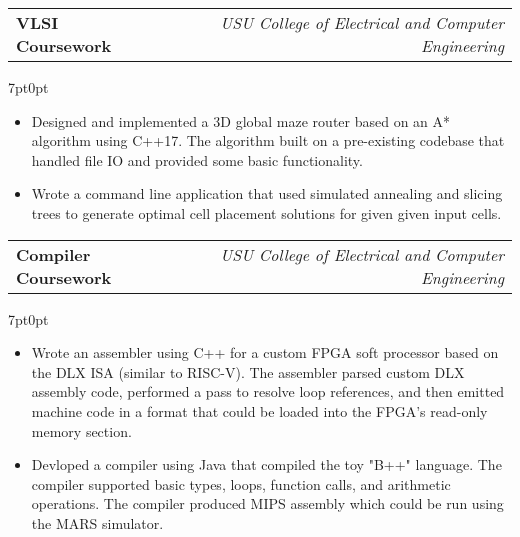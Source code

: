 \documentclass[letterpaper,12pt]{article}
\makeatletter
\newcommand{\simpleHeading}[2]{
    \vspace{-1pt}
    \begin{tabular*}{0.99\textwidth}[t]{l@{\extracolsep{\fill}}r}
        #1 & #2 \\
    \end{tabular*}
}
\newcommand{\simpleParagraph}[1]{
    \vspace{-1pt}
    \begin{adjustwidth}{7pt}{0pt}
        #1
    \end{adjustwidth}
}
\makeatother
\begin{document}
    \vspace{10pt}
    \simpleHeading{\textbf{VLSI Coursework}}{\textit{USU College of Electrical and Computer Engineering}}

    \simpleParagraph{
        \begin{itemize}
            \item Designed and implemented a 3D global maze router based on an A* algorithm using C++17. The algorithm
                built on a pre-existing codebase that handled file IO and provided some basic functionality.

            \item Wrote a command line application that used simulated annealing and slicing
                trees to generate optimal cell placement solutions for given given input cells.

        \end{itemize}
    }
    

    

    
    \vspace{10pt}
    \simpleHeading{\textbf{Compiler Coursework}}{\textit{USU College of Electrical and Computer Engineering}}

    \simpleParagraph{
        \begin{itemize}
            \item Wrote an assembler using C++ for a custom FPGA soft processor based on the DLX ISA (similar
                to RISC-V). The assembler parsed custom DLX assembly code, performed a pass to resolve
                loop references, and then emitted machine code in a format that could be loaded into the FPGA's 
                read-only memory section.

            \item Devloped a compiler using Java that compiled the toy "B++" language. The compiler supported basic 
                types, loops, function calls, and arithmetic operations. The compiler produced MIPS assembly which 
                could be run using the MARS simulator.

        \end{itemize}
    }
    
\end{document}
